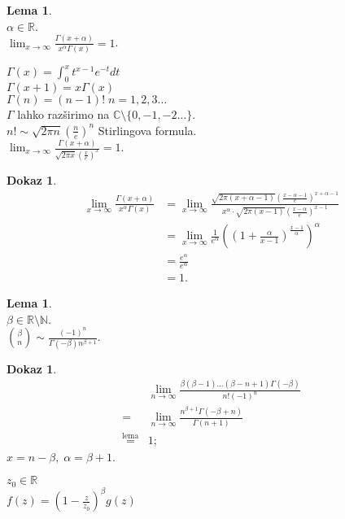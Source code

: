 \documentclass[a4paper, 12pt]{book}
\theoremstyle{definition}
\newtheorem{lemma}[counter]{Lema}
\newtheorem{pro}[counter]{Dokaz}
\theoremstyle{remark}
\newcommand{\N}{\mathbb{N}}
\newcommand{\R}{\mathbb{R}}
\newcommand{\C}{\mathbb{C}}
\begin{document}
\begin{lemma} \text{} \\
  $\alpha \in \R$. \\
  $\lim_{x \to \infty} \frac{\Gamma(x + \alpha)}{x^{\alpha} \Gamma(x)} = 1$.
\end{lemma}
$\Gamma(x) = \int_{0}^{x} t^{x-1} e^{-t} dt$ \\
$\Gamma(x+1) = x \Gamma(x)$ \\
$\Gamma(n) = (n-1)! \; n = 1, 2, 3 \dots$ \\
$\Gamma$ lahko razširimo na $\C \setminus \{0, -1, -2 \dots\}$. \\
$n! \sim \sqrt{2 \pi n} \left(\frac{n}{e}\right)^n$ Stirlingova formula. \\
$\lim_{x \to \infty} \frac{\Gamma(x + \alpha)}{\sqrt{2 \pi x} \left(\frac{x}{e}\right)^x} = 1$.
\begin{pro}
  \begin{align*}
    \lim_{x \to \infty} \frac{\Gamma(x + \alpha)}{x^{\alpha} \Gamma(x)}
    &= \lim_{x \to \infty} \frac
      {\sqrt{2 \pi (x+\alpha-1)} \left(\frac{x-\alpha-1}{e}\right)^{x+\alpha-1}}
      {x^{\alpha} \cdot \sqrt{2 \pi (x-1)} \left(\frac{x-\alpha}{e}\right)^{x-1}} \\
    &= \lim_{x \to \infty} \frac{1}{e^{\alpha}}
      \left(\left(1 + \frac{\alpha}{x-1}\right)^{\frac{x-1}{\alpha}}\right)^{\alpha} \\
    &= \frac{e^{\alpha}}{e^{\alpha}} \\
    &= 1.
  \end{align*}
\end{pro}
\begin{lemma} \text{} \\
  $\beta \in \R \setminus \N$. \\
  $\binom{\beta}{n} \sim \frac{(-1)^n}{\Gamma(-\beta) n^{\beta+1}}$.
\end{lemma}
\begin{pro}
  \begin{align*}
    &\lim_{n \to \infty} \frac{\beta (\beta-1) \dots (\beta-n+1) \Gamma(-\beta)}{n! (-1)^n} \\
    =& \lim_{n \to \infty} \frac{n^{\beta+1} \Gamma(-\beta+n)}{\Gamma(n+1)} \\
    \stackrel{\text{lema}}{=}& 1;
  \end{align*}
  $x = n - \beta, \; \alpha = \beta + 1$.
\end{pro}
$z_0 \in \R$ \\
$f(z) = \left(1 - \frac{z}{z_0}\right)^{\beta} g(z)$ \\
\end{document}
